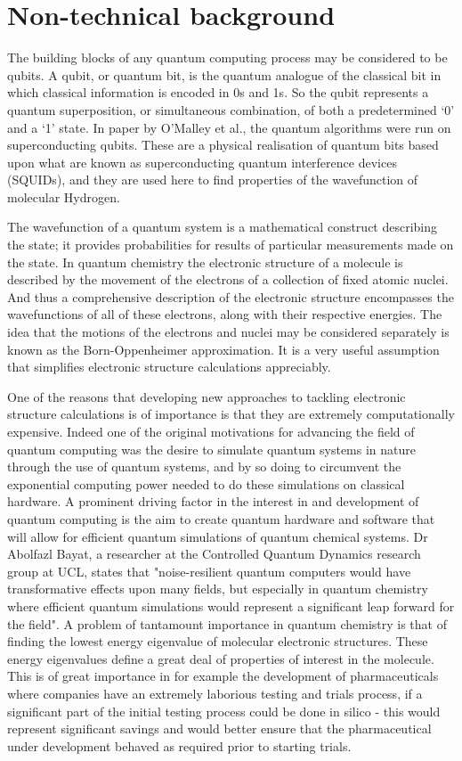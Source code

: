 \documentclass[12pt]{article}
\begin{document}
\section{Non-technical background}

The building blocks of any quantum computing process may be considered to be qubits. A qubit, or quantum bit, is the quantum analogue of the
classical bit in which classical information is encoded in 0s and 1s. So the qubit represents a quantum superposition, or simultaneous combination, of
both a predetermined `0’ and a `1’ state. In paper by O’Malley et al., the quantum algorithms were run on superconducting qubits. These are a
physical realisation of quantum bits based upon what are known as superconducting quantum interference devices (SQUIDs), and they are used here
to find properties of the wavefunction of molecular Hydrogen.

The wavefunction of a quantum system is a mathematical construct describing the state; it provides probabilities for results of particular measurements
 made on the state. In quantum chemistry the electronic structure of a molecule is described by the movement of the electrons of a collection of fixed
  atomic nuclei. And thus a comprehensive description of the electronic structure encompasses the wavefunctions of all of these electrons, along with
  their respective energies. The idea that the motions of the electrons and nuclei may be considered separately is known as the Born-Oppenheimer
  approximation. It is a very useful assumption that simplifies electronic structure calculations appreciably.

One of the reasons that developing new approaches to tackling electronic structure calculations is of importance is that they are extremely
computationally expensive. Indeed one of the original motivations for advancing the field of quantum computing was the desire to simulate quantum
 systems in nature through the use of quantum systems, and by so doing to circumvent the exponential computing power needed to do these simulations
 on classical hardware. A prominent driving factor in the interest in and development of quantum computing is the aim to create quantum hardware
 and software that will allow for efficient quantum simulations of quantum chemical systems. Dr Abolfazl Bayat, a researcher at the Controlled
 Quantum Dynamics research group at UCL, states that "noise-resilient quantum computers would have transformative effects upon many fields,
 but especially in quantum chemistry where efficient quantum simulations would represent a significant leap forward for the field". A problem of
 tantamount importance in quantum chemistry is that of finding the lowest energy eigenvalue of molecular electronic structures. These energy
 eigenvalues define a great deal of properties of interest in the molecule. This is of great importance in for example the development of
 pharmaceuticals where companies have an extremely laborious testing and trials process, if a significant part of the initial testing process
 could be done in silico - this would represent significant savings and would better ensure that the pharmaceutical under development behaved as
 required prior to starting trials.
\end{document}
